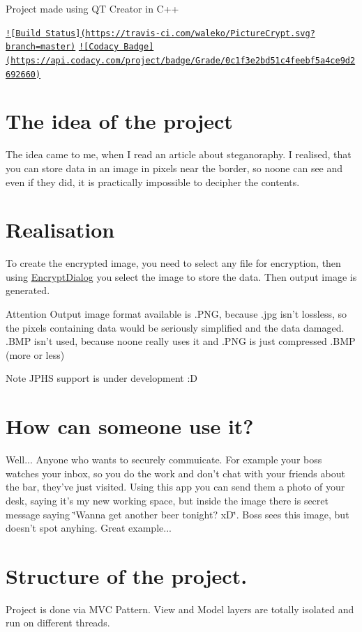 Project made using Q\-T Creator in C++

\href{https://travis-ci.com/waleko/PictureCrypt}{\tt !\mbox{[}Build Status\mbox{]}(https\-://travis-\/ci.\-com/waleko/\-Picture\-Crypt.\-svg?branch=master)} \href{https://app.codacy.com/app/waleko/PictureCrypt?utm_source=github.com&utm_medium=referral&utm_content=waleko/PictureCrypt&utm_campaign=Badge_Grade_Dashboard}{\tt !\mbox{[}Codacy Badge\mbox{]}(https\-://api.\-codacy.\-com/project/badge/\-Grade/0c1f3e2bd51c4feebf5a4ce9d2692660)}\hypertarget{index_idea}{}\section{The idea of the project}\label{index_idea}
The idea came to me, when I read an article about steganoraphy. I realised, that you can store data in an image in pixels near the border, so noone can see and even if they did, it is practically impossible to decipher the contents. \hypertarget{index_real}{}\section{Realisation}\label{index_real}
To create the encrypted image, you need to select any file for encryption, then using \hyperlink{class_encrypt_dialog}{Encrypt\-Dialog} you select the image to store the data. Then output image is generated. \begin{DoxyAttention}{Attention}
Output image format available is .P\-N\-G, because .jpg isn't lossless, so the pixels containing data would be seriously simplified and the data damaged. .B\-M\-P isn't used, because noone really uses it and .P\-N\-G is just compressed .B\-M\-P (more or less) 
\end{DoxyAttention}
\begin{DoxyNote}{Note}
J\-P\-H\-S support is under development \-:D
\end{DoxyNote}
\hypertarget{index_use}{}\section{How can someone use it?}\label{index_use}
Well... Anyone who wants to securely commuicate. For example your boss watches your inbox, so you do the work and don't chat with your friends about the bar, they've just visited. Using this app you can send them a photo of your desk, saying it's my new working space, but inside the image there is secret message saying \char`\"{}\-Wanna get another beer tonight? x\-D\char`\"{}. Boss sees this image, but doesn't spot anyhing. Great example... \hypertarget{index_structure}{}\section{Structure of the project.}\label{index_structure}
Project is done via M\-V\-C Pattern. View and Model layers are totally isolated and run on different threads.

